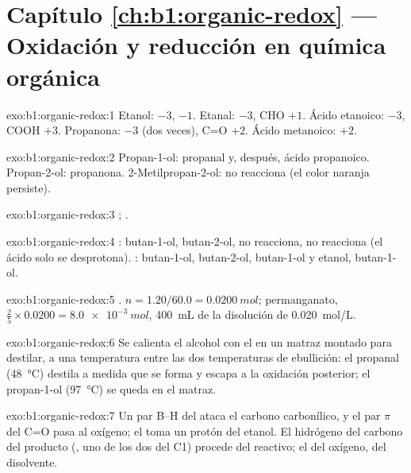 \section*{Capítulo \ref{ch:b1:organic-redox} --- Oxidación y reducción en química orgánica}

\begin{solution}{exo:b1:organic-redox:1}
Etanol:  $-3$,  $-1$. Etanal:  $-3$, CHO $+1$.
Ácido etanoico:  $-3$, COOH $+3$. Propanona:  $-3$ (dos
veces), C=O $+2$. Ácido metanoico: $+2$.
\end{solution}

\begin{solution}{exo:b1:organic-redox:2}
Propan-1-ol: propanal y, después, ácido propanoico. Propan-2-ol:
propanona. 2-Metilpropan-2-ol: no reacciona (el color naranja persiste).
\end{solution}

\begin{solution}{exo:b1:organic-redox:3}
;
.
\end{solution}

\begin{solution}{exo:b1:organic-redox:4}
: butan-1-ol, butan-2-ol, no reacciona, no reacciona (el ácido
solo se desprotona). : butan-1-ol, butan-2-ol, butan-1-ol y
etanol, butan-1-ol.
\end{solution}

\begin{solution}{exo:b1:organic-redox:5}
.
$n = 1.20/60.0 = \qty{0.0200}{mol}$; permanganato, $\frac25 \times 0.0200 =
\qty{8.0e-3}{mol}$, \qty{400}{mL} de la disolución de \qty{0.020}{mol/L}.
\end{solution}

\begin{solution}{exo:b1:organic-redox:6}
Se calienta el alcohol con el  en un matraz montado para
destilar, a una temperatura entre las dos temperaturas de ebullición: el
propanal (\qty{48}{\celsius}) destila a medida que se forma y escapa a la
oxidación posterior; el propan-1-ol (\qty{97}{\celsius}) se queda en el
matraz.
\end{solution}

\begin{solution}{exo:b1:organic-redox:7}
Un par B--H del  ataca el carbono carbonílico, y el par $\pi$ del
C=O pasa al oxígeno; el  toma un protón del etanol. El hidrógeno
del carbono del producto (, uno de los dos del C1) procede
del reactivo; el del oxígeno, del disolvente.
\end{solution}

